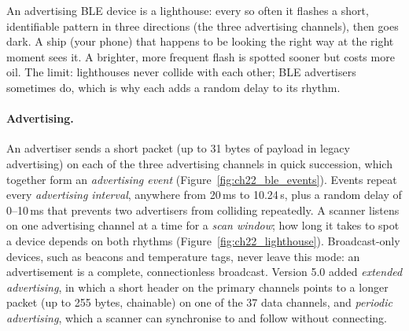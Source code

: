 \begin{analogy}
An advertising BLE device is a lighthouse: every so often it flashes a short, identifiable pattern
in three directions (the three advertising channels), then goes dark. A ship (your phone) that
happens to be looking the right way at the right moment sees it. A brighter, more frequent flash is
spotted sooner but costs more oil. The limit: lighthouses never collide with each other; BLE
advertisers sometimes do, which is why each adds a random delay to its rhythm.
\end{analogy}

\paragraph{Advertising.} An advertiser sends a short packet (up to 31 bytes of payload in legacy
advertising) on each of the three advertising channels in quick succession, which together form an
\emph{advertising event} (Figure~\ref{fig:ch22_ble_events}). Events repeat every \emph{advertising
interval}, anywhere from 20\,ms to 10.24\,s, plus a random delay of 0--10\,ms that prevents two
advertisers from colliding repeatedly. A scanner listens on one advertising channel at a time for a
\emph{scan window}; how long it takes to spot a device depends on both rhythms
(Figure~\ref{fig:ch22_lighthouse}). Broadcast-only devices, such as beacons and temperature tags,
never leave this mode: an advertisement is a complete, connectionless broadcast. Version 5.0 added
\emph{extended advertising}, in which a short header on the primary channels points to a longer
packet (up to 255 bytes, chainable) on one of the 37 data channels, and \emph{periodic advertising},
which a scanner can synchronise to and follow without connecting.


